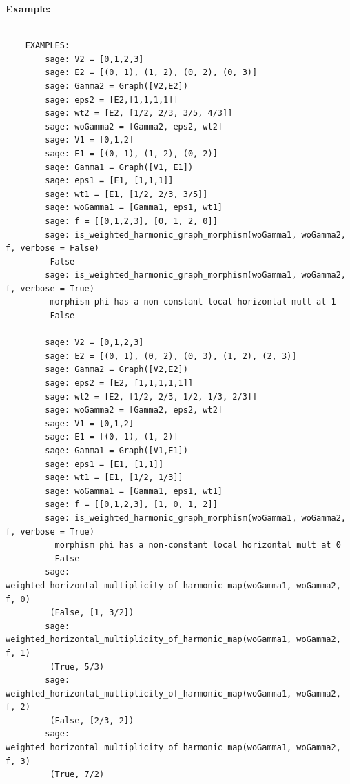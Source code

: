 \documentclass{article}
\begin{document}
\textbf{Example:}
\begin{verbatim}

    EXAMPLES:
        sage: V2 = [0,1,2,3]
        sage: E2 = [(0, 1), (1, 2), (0, 2), (0, 3)]
        sage: Gamma2 = Graph([V2,E2])
        sage: eps2 = [E2,[1,1,1,1]]
        sage: wt2 = [E2, [1/2, 2/3, 3/5, 4/3]]
        sage: woGamma2 = [Gamma2, eps2, wt2]
        sage: V1 = [0,1,2]
        sage: E1 = [(0, 1), (1, 2), (0, 2)]
        sage: Gamma1 = Graph([V1, E1])
        sage: eps1 = [E1, [1,1,1]]
        sage: wt1 = [E1, [1/2, 2/3, 3/5]]
        sage: woGamma1 = [Gamma1, eps1, wt1]
        sage: f = [[0,1,2,3], [0, 1, 2, 0]]       
        sage: is_weighted_harmonic_graph_morphism(woGamma1, woGamma2, f, verbose = False)
         False
        sage: is_weighted_harmonic_graph_morphism(woGamma1, woGamma2, f, verbose = True)
         morphism phi has a non-constant local horizontal mult at 1
         False
    
        sage: V2 = [0,1,2,3]
        sage: E2 = [(0, 1), (0, 2), (0, 3), (1, 2), (2, 3)]
        sage: Gamma2 = Graph([V2,E2])
        sage: eps2 = [E2, [1,1,1,1,1]]
        sage: wt2 = [E2, [1/2, 2/3, 1/2, 1/3, 2/3]]       
        sage: woGamma2 = [Gamma2, eps2, wt2]
        sage: V1 = [0,1,2]
        sage: E1 = [(0, 1), (1, 2)]
        sage: Gamma1 = Graph([V1,E1])
        sage: eps1 = [E1, [1,1]]
        sage: wt1 = [E1, [1/2, 1/3]]     
        sage: woGamma1 = [Gamma1, eps1, wt1]
        sage: f = [[0,1,2,3], [1, 0, 1, 2]]       
        sage: is_weighted_harmonic_graph_morphism(woGamma1, woGamma2, f, verbose = True)
          morphism phi has a non-constant local horizontal mult at 0
          False
        sage: weighted_horizontal_multiplicity_of_harmonic_map(woGamma1, woGamma2, f, 0)
         (False, [1, 3/2])
        sage: weighted_horizontal_multiplicity_of_harmonic_map(woGamma1, woGamma2, f, 1)
         (True, 5/3)
        sage: weighted_horizontal_multiplicity_of_harmonic_map(woGamma1, woGamma2, f, 2)
         (False, [2/3, 2])
        sage: weighted_horizontal_multiplicity_of_harmonic_map(woGamma1, woGamma2, f, 3)
         (True, 7/2)


\end{verbatim}
\end{document}
